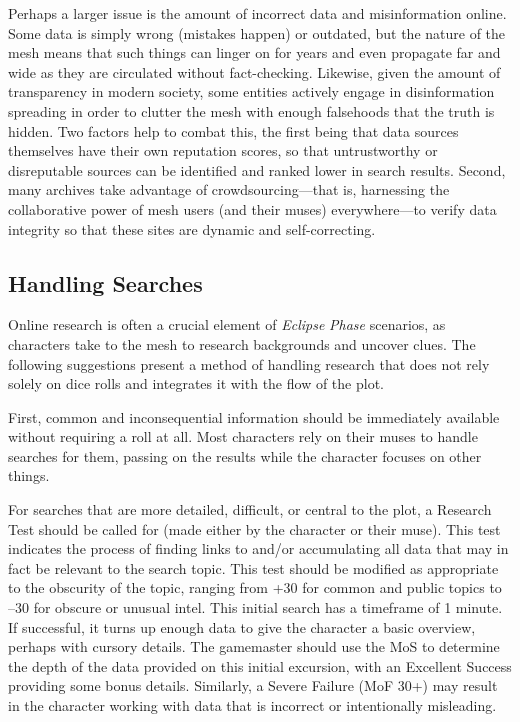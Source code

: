 Perhaps a larger issue is the amount of incorrect 
data and misinformation online. Some data is simply 
wrong (mistakes happen) or outdated, but the nature 
of the mesh means that such things can linger on for 
years and even propagate far and wide as they are 
circulated without fact-checking. Likewise, given 
the amount of transparency in modern society, some 
entities actively engage in disinformation spreading 
in order to clutter the mesh with enough falsehoods 
that the truth is hidden. Two factors help to combat 
this, the first being that data sources themselves have 
their own reputation scores, so that untrustworthy 
or disreputable sources can be identified and ranked 
lower in search results. Second, many archives take 
advantage of crowdsourcing—that is, harnessing the 
collaborative power of mesh users (and their muses) 
everywhere—to verify data integrity so that these sites 
are dynamic and self-correcting.

\subsection{Handling Searches}

Online research is often a crucial element of \textit{Eclipse }
\textit{Phase} scenarios, as characters take to the mesh to 
research backgrounds and uncover clues. The following
suggestions present a method of handling research
that does not rely solely on dice rolls and integrates it 
with the flow of the plot.

First, common and inconsequential information 
should be immediately available without requiring 
a roll at all. Most characters rely on their muses to 
handle searches for them, passing on the results while 
the character focuses on other things.

For searches that are more detailed, difficult, or 
central to the plot, a Research Test should be called 
for (made either by the character or their muse). 
This test indicates the process of finding links to 
and/or accumulating all data that may in fact be 
relevant to the search topic. This test should be 
modified as appropriate to the obscurity of the topic, 
ranging from +30 for common and public topics 
to –30 for obscure or unusual intel. This initial 
search has a timeframe of 1 minute. If successful, it 
turns up enough data to give the character a basic 
overview, perhaps with cursory details. The gamemaster
should use the MoS to determine the depth
of the data provided on this initial excursion, with 
an Excellent Success providing some bonus details. 
Similarly, a Severe Failure (MoF 30+) may result in 
the character working with data that is incorrect or 
intentionally misleading.

